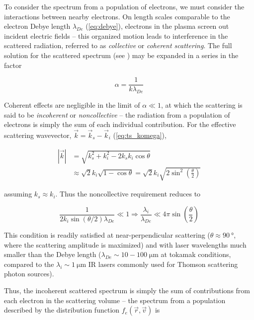 To consider the spectrum from a population of electrons, we must consider the interactions between nearby electrons.  On length scales comparable to the electron Debye length $\lambda_{De}$ (\cref{eq:debye}), electrons in the plasma screen out incident electric fields -- this organized motion leads to interference in the scattered radiation, referred to as \emph{collective} or \emph{coherent scattering}.  The full solution for the scattered spectrum (see \cite[\S 3]{Sheffield}) may be expanded in a series in the factor

\begin{equation}\label{eq:ts_alpha}
 \alpha = \frac{1}{k\lambda_{De}}
\end{equation}

\noindent Coherent effects are negligible in the limit of $\alpha \ll 1$, at which the scattering is said to be \emph{incoherent} or \emph{noncollective} -- the radiation from a population of electrons is simply the sum of each individual contribution.  For the effective scattering wavevector, $\vec{k} = \vec{k}_s - \vec{k}_i$ (\cref{eq:ts_komega}),

\begin{equation}
 \begin{aligned}
 \left| \vec{k} \right| &= \sqrt{k_s^2 + k_i^2 - 2k_s k_i \cos \theta}\\ &\approx \sqrt{2} k_i \sqrt{1 - \cos \theta} = \sqrt{2} k_i \sqrt{2 \sin^2 \left(\frac{\theta}{2}\right)}
 \end{aligned}
\end{equation}

\noindent assuming $k_s \approx k_i$.  Thus the noncollective requirement reduces to

\begin{equation}\label{eq:ts_incoherent}
 \frac{1}{2k_i \sin(\theta/2) \lambda_{De}} \ll 1 \Rightarrow \frac{\lambda_i}{\lambda_{De}} \ll 4\pi \sin \left(\frac{\theta}{2}\right)
\end{equation}

\noindent This condition is readily satisfied at near-perpendicular scattering ($\theta \approx \SI{90}{\degree}$, where the scattering amplitude is maximized) and with laser wavelengths much smaller than the Debye length ($\lambda_{De} \sim 10-100 \;\si{\micro\meter}$ at tokamak conditions, compared to the $\lambda_i \sim \SI{1}{\micro\meter}$ IR lasers commonly used for Thomson scattering photon sources).

Thus, the incoherent scattered spectrum is simply the sum of contributions from each electron in the scattering volume -- the spectrum from a population described by the distribution function $f_e(\vec{r},\vec{v})$ is

